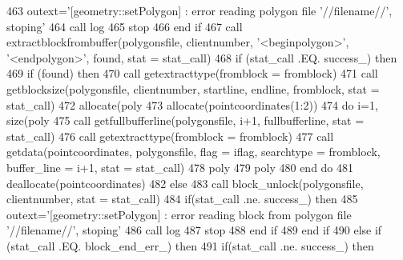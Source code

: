 \begin{DoxyCode}
463             outext=\textcolor{stringliteral}{'[geometry::setPolygon] : error reading polygon file '}//filename//\textcolor{stringliteral}{', stoping'}
464             \textcolor{keyword}{call }log%
465             stop
466 \textcolor{keywordflow}{        end if}
467         \textcolor{keyword}{call }extractblockfrombuffer(polygonsfile, clientnumber, \textcolor{stringliteral}{'<beginpolygon>'}, \textcolor{stringliteral}{'<endpolygon>'}, found, 
      stat = stat\_call)
468         \textcolor{keywordflow}{if} (stat\_call .EQ. success\_) \textcolor{keywordflow}{then}
469             \textcolor{keywordflow}{if} (found) \textcolor{keywordflow}{then}
470                 \textcolor{keyword}{call }getextracttype(fromblock = fromblock)
471                 \textcolor{keyword}{call }getblocksize(polygonsfile, clientnumber, startline, endline, fromblock, stat = 
      stat\_call)
472                 \textcolor{keyword}{allocate}(poly%
473                 \textcolor{keyword}{allocate}(pointcoordinates(1:2))
474                 \textcolor{keywordflow}{do} i=1, \textcolor{keyword}{size}(poly%
475                     \textcolor{keyword}{call }getfullbufferline(polygonsfile, i+1, fullbufferline, stat = stat\_call)
476                     \textcolor{keyword}{call }getextracttype(fromblock = fromblock)
477                     \textcolor{keyword}{call }getdata(pointcoordinates, polygonsfile, flag = iflag, searchtype = fromblock, 
      buffer\_line = i+1, stat = stat\_call)
478                     poly%
479                     poly%
480 \textcolor{keywordflow}{                end do}
481                 \textcolor{keyword}{deallocate}(pointcoordinates)
482             \textcolor{keywordflow}{else}
483                 \textcolor{keyword}{call }block\_unlock(polygonsfile, clientnumber, stat = stat\_call)
484                 \textcolor{keywordflow}{if}(stat\_call .ne. success\_) \textcolor{keywordflow}{then}
485                     outext=\textcolor{stringliteral}{'[geometry::setPolygon] : error reading block from polygon file '}//filename//\textcolor{stringliteral}{',
       stoping'}
486                     \textcolor{keyword}{call }log%
487                     stop
488 \textcolor{keywordflow}{                end if}
489 \textcolor{keywordflow}{            end if}
490         \textcolor{keywordflow}{else} \textcolor{keywordflow}{if} (stat\_call .EQ. block\_end\_err\_) \textcolor{keywordflow}{then}
491             \textcolor{keywordflow}{if}(stat\_call .ne. success\_) \textcolor{keywordflow}{then}

\end{DoxyCode}
